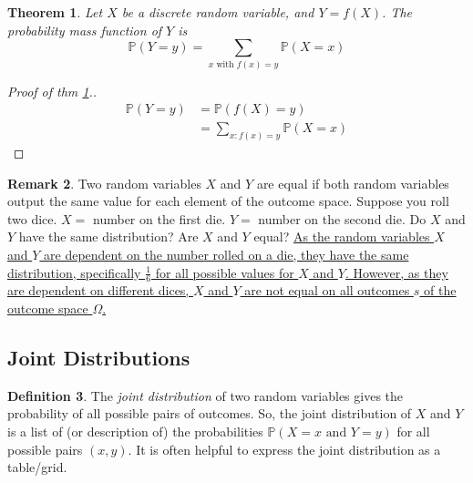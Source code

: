 \documentclass[12pt]{article}
\newcommand{\bbP}{\mathbb{P}}
\renewcommand{\_}[1]{\underline{ #1 }}
\newtheorem{theorem}{Theorem}[section]
\theoremstyle{definition}
\newtheorem{definition}[theorem]{Definition}
\newtheorem{remark}[theorem]{Remark}
\numberwithin{equation}{subsection}
\begin{document}
\begin{theorem}\label{functions}
	Let $X$ be a discrete random variable, and $Y=f(X)$. The probability mass function of $Y$ is
	\[\bbP(Y=y)=\sum_{x \text{ with } f(x)=y}\bbP(X=x)\]
\end{theorem} 

\begin{proof}[Proof of thm \ref{functions}.]
	\begin{align*}
		\bbP(Y=y)&=\bbP(f(X)=y) \\
			&=\sum_{x:f(x)=y}\bbP(X=x)
	\end{align*}
\end{proof}

\begin{remark}
	Two random variables $X$ and $Y$ are equal if both random variables output the same value for each element of the outcome space. Suppose you roll two dice. $X=$ number on the first die. $Y=$ number on the second die. Do $X$ and $Y$ have the same distribution? Are $X$ and $Y$ equal? \ul{As the random variables $X$ and $Y$ are dependent on the number rolled on a die, they have the same distribution, specifically $\frac{1}{6}$ for all possible values for $X$ and $Y$. However, as they are dependent on different dices, $X$ and $Y$ are not equal on all outcomes $s$ of the outcome space $\Omega$.}
\end{remark}

\subsection{Joint Distributions}


\begin{definition}
	The \emph{joint distribution} of two random variables gives the probability of all possible pairs of outcomes. So, the joint distribution of $X$ and $Y$ is a list of (or description of) the probabilities $\bbP(X=x\text{ and } Y=y)$ for all possible pairs $(x,y)$. It is often helpful to express the joint distribution as a table/grid.
\end{definition}
\end{document}
